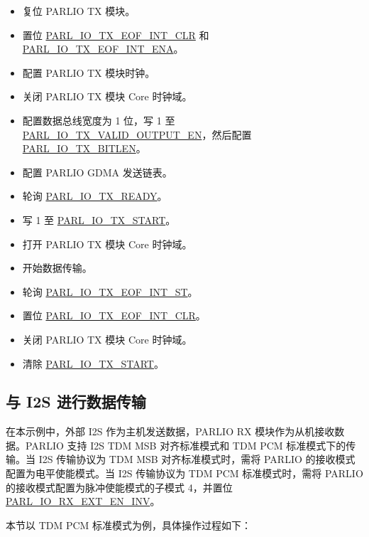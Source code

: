 \documentclass[main\_\_CN.tex]{subfiles}
\begin{document}
\begin{itemize}
\begin{itemize}
        \item 复位 PARLIO TX 模块。
        \item 置位 \hyperref[fielddesc:PARLIOTXEOFINTCLR]{PARL\_IO\_TX\_EOF\_INT\_CLR} 和 \hyperref[fielddesc:PARLIOTXEOFINTENA]{PARL\_IO\_TX\_EOF\_INT\_ENA}。
        \item 配置 PARLIO TX 模块时钟。
        \item 关闭 PARLIO TX 模块 Core 时钟域。
        \item 配置数据总线宽度为 1 位，写 1 至 \hyperref[fielddesc:PARLIOTXVALIDOUTPUTEN]{PARL\_IO\_TX\_VALID\_OUTPUT\_EN}，然后配置 \hyperref[fielddesc:PARLIOTXBITLEN]{PARL\_IO\_TX\_BITLEN}。
        \item 配置 PARLIO GDMA 发送链表。
        \item 轮询 \hyperref[fielddesc:PARLIOTXREADY]{PARL\_IO\_TX\_READY}。        
        \item 写 1 至 \hyperref[fielddesc:PARLIOTXSTART]{PARL\_IO\_TX\_START}。
        \item 打开 PARLIO TX 模块 Core 时钟域。
        \item 开始数据传输。
        \item 轮询 \hyperref[fielddesc:PARLIOTXEOFINTST]{PARL\_IO\_TX\_EOF\_INT\_ST}。
        \item 置位 \hyperref[fielddesc:PARLIOTXEOFINTCLR]{PARL\_IO\_TX\_EOF\_INT\_CLR}。
        \item 关闭 PARLIO TX 模块 Core 时钟域。
        \item 清除 \hyperref[fielddesc:PARLIOTXSTART]{PARL\_IO\_TX\_START}。  
    \end{itemize} 
\end{itemize}

\subsection{与 I2S 进行数据传输}

在本示例中，外部 I2S 作为主机发送数据，PARLIO RX 模块作为从机接收数据。PARLIO 支持 I2S TDM MSB 对齐标准模式和 TDM PCM 标准模式下的传输。当 I2S 传输协议为 TDM MSB 对齐标准模式时，需将 PARLIO 的接收模式配置为电平使能模式。当 I2S 传输协议为 TDM PCM 标准模式时，需将 PARLIO 的接收模式配置为脉冲使能模式的子模式 4，并置位 \hyperref[fielddesc:PARLIORXEXTENINV]{PARL\_IO\_RX\_EXT\_EN\_INV}。

本节以 TDM PCM 标准模式为例，具体操作过程如下：
\end{document}
